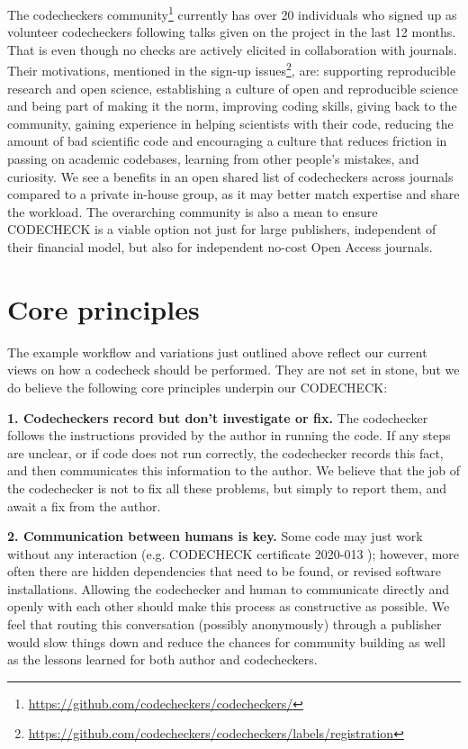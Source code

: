 \documentclass[12pt]{article}
\begin{document}
The codecheckers community\footnote{\href{https://github.com/codecheckers/codecheckers/}{https://github.com/codecheckers/codecheckers/}}
currently has over 20 individuals who signed up as volunteer codecheckers
following talks given on the project in the last 12 months.
That is even though no checks are actively elicited in collaboration
with journals.
Their motivations, mentioned in the sign-up issues\footnote{
\url{https://github.com/codecheckers/codecheckers/labels/registration}},
are:
supporting reproducible research and open science,
establishing a culture of open and reproducible science and being part
of making it the norm,
improving coding skills,
giving back to the community,
gaining experience in helping scientists with their code,
reducing the amount of bad scientific code and encouraging a culture that
reduces friction in passing on academic codebases,
learning from other people's mistakes,
and curiosity.
We see a benefits in an open shared list of codecheckers
across journals
compared to a private in-house group, as it may better match expertise
and share the workload.
The overarching community is also a mean to ensure CODECHECK is a viable
option not just for large publishers, independent of their financial model,
but also for independent no-cost Open Access journals.

\section*{Core principles}\label{core-principles}

The example workflow and variations just outlined above reflect our current
views on how a codecheck should be performed. They are not set in
stone, but we do believe the following core principles underpin our
CODECHECK:

\textbf{1. Codecheckers record but don't investigate or fix.} The
codechecker follows the instructions provided by the author in running
the code. If any steps are unclear, or if code does not run correctly,
the codechecker records this fact, and then communicates this
information to the author. We believe that the job of the codechecker is
not to fix all these problems, but simply to report them, and await a
fix from the author.

\textbf{2. Communication between humans is key.} Some code may just
work without any interaction (e.g. CODECHECK certificate 2020-013
\cite{cert-2020-013}); however, more often there are hidden
dependencies that need to be found, or revised software
installations. Allowing the codechecker and human to communicate
directly and openly with each other should make this process as
constructive as possible. We feel that routing this conversation
(possibly anonymously) through a publisher would slow things down and
reduce the chances for community building as well as the lessons
learned for both author and codecheckers.
\end{document}
